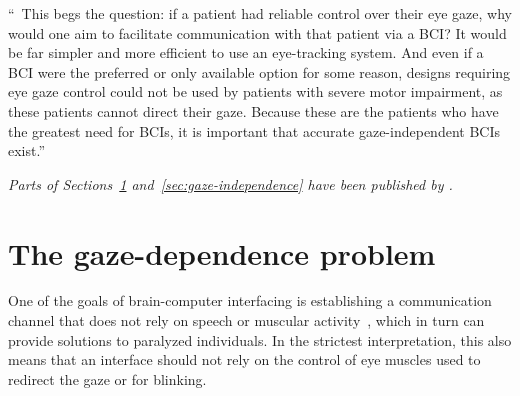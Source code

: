 \epigraph{%
  ``\elide\ This begs the question: if a patient had reliable control
  over their eye gaze, why would one aim to facilitate communication with that
  patient via a BCI? It would be far simpler and more efficient to use an
  eye-tracking system.
  And even if a BCI were the preferred or only available option for some reason,
  designs requiring eye gaze control could not be used
  by patients with severe motor impairment, as these patients
  cannot direct their gaze.
  Because these are the patients who have the greatest need for BCIs, it is
  important that accurate gaze-independent BCIs exist.''
}{%
  \textcite{Egan2017}
}

\emph{Parts of Sections~\ref{sec:gaze-dependence} and~\ref{sec:gaze-independence}
have been published by \textcite{VanDenKerchove2024}.}


\section{The gaze-dependence problem}%
\label{sec:gaze-dependence}


One of the goals of brain-computer interfacing is establishing a communication
channel that does not rely on speech or muscular activity~\cite{Naci2012,Chaudhary2016},
which in turn can provide solutions to paralyzed individuals.
In the strictest interpretation, this also means that an interface should not
rely on the control of eye muscles used to redirect the gaze or for blinking.

